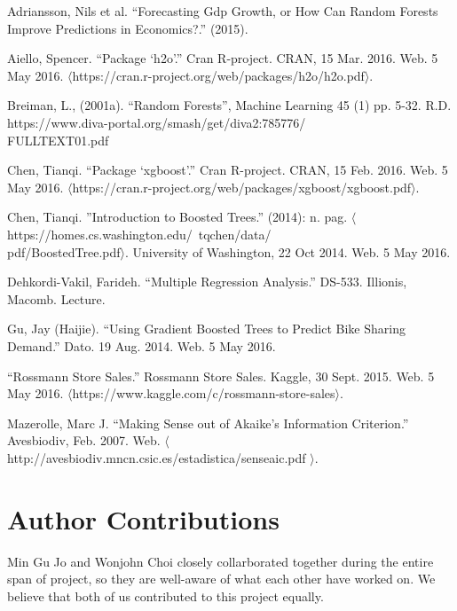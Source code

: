 \documentclass[letterpaper,twocolumn,11pt]{article}
\begin{document}
Adriansson, Nils et al. “Forecasting Gdp Growth, or How Can Random Forests Improve Predictions in Economics?.” (2015).

Aiello, Spencer. ``Package ‘h2o'.'' Cran R-project. CRAN, 15 Mar. 2016. Web. 5 May 2016. $\langle$https://cran.r-project.org/web/packages/h2o/h2o.pdf$\rangle$.

Breiman, L., (2001a). ``Random Forests'', Machine Learning 45 (1) pp. 5-32.
R.D. https://www.diva-portal.org/smash/get/diva2:785776/\\
FULLTEXT01.pdf

Chen, Tianqi. ``Package ‘xgboost'.'' Cran R-project. CRAN, 15 Feb. 2016. Web. 5 May 2016. $\langle$https://cran.r-project.org/web/packages/xgboost/xgboost.pdf$\rangle$.

Chen, Tianqi. ”Introduction to Boosted Trees.” (2014): n. pag. $\langle$https://homes.cs.washington.edu/~tqchen/data/\\
pdf/BoostedTree.pdf$\rangle$. University of Washington, 22 Oct 2014. Web. 5 May 2016.

Dehkordi-Vakil, Farideh. ``Multiple Regression Analysis.'' DS-533. Illionis, Macomb. Lecture.

Gu, Jay (Haijie). ``Using Gradient Boosted Trees to Predict Bike Sharing Demand.'' Dato. 19 Aug. 2014. Web. 5 May 2016.

``Rossmann Store Sales.'' Rossmann Store Sales. Kaggle, 30 Sept. 2015. Web. 5 May 2016. $\langle$https://www.kaggle.com/c/rossmann-store-sales$\rangle$.

Mazerolle, Marc J. ``Making Sense out of Akaike’s Information Criterion.'' Avesbiodiv, Feb. 2007. Web. $\langle$ http://avesbiodiv.mncn.csic.es/estadistica/senseaic.pdf $\rangle$.

\section{Author Contributions}
Min Gu Jo and Wonjohn Choi closely collarborated together during the entire span of project, so they are well-aware of what each other have worked on. We believe that both of us contributed to this project equally.
\end{document}

